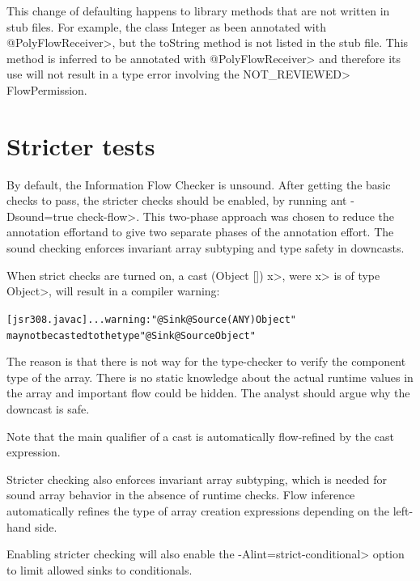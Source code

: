 This change of defaulting happens to library methods that are not written in stub files.  For example, the class
 Integer as been annotated with  \<@PolyFlowReceiver>, but the toString method is not listed in the stub file.  
 This method is inferred to be annotated with  \<@PolyFlowReceiver> and therefore its use will not result in a 
 type error  involving the \<NOT\_REVIEWED> FlowPermission. 
 






\section{Stricter tests\label{sec:stricter}}

By default, the Information Flow Checker is unsound.  After getting the basic checks to pass, the
 stricter checks should be enabled, by running \<ant -Dsound=true check-flow>.
This two-phase approach was chosen to reduce
the annotation effortand to give two separate phases of
the annotation effort.
 The sound checking enforces invariant 
array subtyping and type safety in downcasts.


When strict checks are turned on,
a cast \<(Object []) x>, were \<x> is of type \<Object>, will result
in a compiler warning:

\begin{alltt}
[jsr308.javac] ... warning: "@Sink @Source({ANY}) Object"
       may not be casted to the type "@Sink @Source Object"
\end{alltt}

The reason is that there is not way for the type-checker to verify
 the component type of the array. There is no static knowledge about the actual
runtime values in the array and important flow could be hidden.
The analyst should argue why the downcast is safe.

Note that the main qualifier of a cast is automatically flow-refined
by the cast expression.


\medskip

Stricter checking also enforces invariant array subtyping, which is
needed for sound array behavior in the absence of runtime checks.
Flow inference automatically refines the type of array creation
expressions depending on the left-hand side.

\medskip

Enabling stricter checking will also enable the \<-Alint=strict-conditional> option to limit 
allowed sinks to conditionals.


